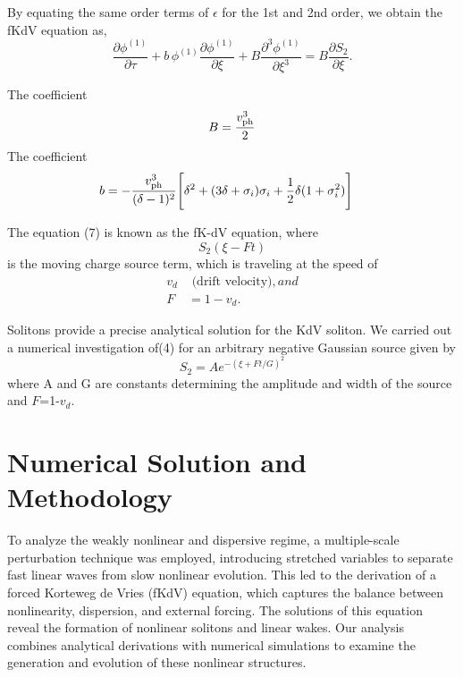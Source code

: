\documentclass[%
 aip,
 amsmath,amssymb,
 reprint,%
]{revtex4-1}
\begin{document}
 



By equating the same order terms of $\epsilon$ for the 1st and 2nd order, we obtain the fKdV equation as,
\begin{equation} 
\frac{\partial \phi^{(1)}}{\partial \tau} 
+ b \, \phi^{(1)} \frac{\partial \phi^{(1)}}{\partial \xi} 
+ B \frac{\partial^3 \phi^{(1)}}{\partial \xi^3} 
= B \frac{\partial S_2}{\partial \xi}.
\end{equation}

The coefficient  \begin{equation} 
B = \frac{v_{\rm ph}^3}{2}
\end{equation}
The  coefficient 
\begin{align}
b &= -\frac{v_{\rm ph}^3}{(\delta - 1)^2} 
\Biggl[ 
\delta^2 + (3 \delta + \sigma_i)\sigma_i 
+ \frac{1}{2} \delta (1 + \sigma_i^2) 
\Biggr]
\end{align}

The equation (7) is known as the fK-dV equation, where \[S_2(\xi - F t)\] is the moving charge source term, which is traveling at the speed of  
\begin{align*}v_d & \text{ (drift velocity)}, and\\F &= 1 - v_d.\end{align*}

Solitons provide a precise analytical solution for the KdV soliton\cite{r28}.  We carried out a numerical investigation of(4) for an arbitrary negative Gaussian source given by 
\[
S_2 = A e^{-(\xi + Ft/G)^2}
\] where A and G are constants determining the amplitude and width of the source and  $F$=1-$v_d$.

\section{Numerical Solution and Methodology}
To analyze the weakly nonlinear and dispersive regime,  a multiple-scale perturbation technique was employed, introducing stretched variables to separate fast linear waves from slow nonlinear evolution. This led to the derivation of a forced Korteweg de Vries (fKdV) equation, which captures the balance between nonlinearity, dispersion, and external forcing. The solutions of this equation reveal the formation of nonlinear solitons  and linear wakes.  Our analysis combines analytical derivations with numerical simulations to examine the generation and evolution of these nonlinear structures.
\end{document}
